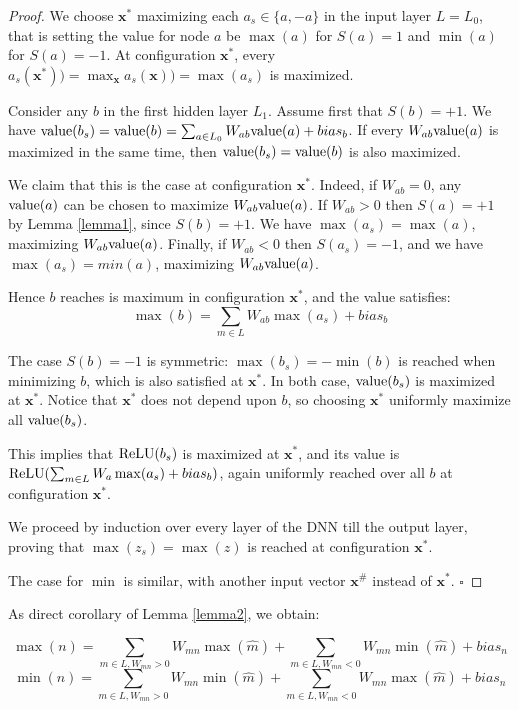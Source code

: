 		\begin{proof}
			We choose $\boldsymbol{x}^*$ maximizing each $a_s \in \{a,-a\}$ in the input layer $L=L_0$,
			that is setting the value for node $a$ be $\max(a)$ for $S(a)=1$ and $\min(a)$ for $S(a)=-1$.
			At configuration $\boldsymbol{x}^*$, every $a_s(\boldsymbol{x}^*))=\max_{\boldsymbol{x}} {a_s(\boldsymbol{x}))}=\max(a_s)$ is maximized.  
			
			Consider any $b$ in the first hidden layer $L_1$.
			Assume first that $S(b)=+1$.
			We have ${\textrm{value}}(b_s)= {\textrm{value}}(b) = \sum_{a \in L_0} W_{ab} {\textrm{value}}(a) + bias_b$.
			If every $W_{ab} {\textrm{value}}(a)$ is maximized in the same time, 
			then ${\textrm{value}}(b_s)= {\textrm{value}}(b)$ is also maximized. 
			
			We claim that this is the case at 
			configuration $\boldsymbol{x}^*$.
			Indeed, if $W_{ab}=0$, any ${\textrm{value}}(a)$ can be chosen to maximize 
			$W_{ab}{\textrm{value}}(a)$. If $W_{ab}>0$ then $S(a) = +1$ by Lemma \ref{lemma1}, since
			$S(b)=+1$. We have $\max(a_s) = \max(a)$, maximizing $W_{ab}{\textrm{value}}(a)$.
			Finally, if $W_{a b}<0$ then $S(a_s) = -1$, and we have 
			$\max(a_s) = min(a)$, maximizing $W_{ab}{\textrm{value}}(a)$.
			
			Hence $b$ reaches is maximum in configuration $\boldsymbol{x}^*$, and the value satisfies: 
			$$\max(b)=\sum_{m \in L}W_{a b} \max(a_s)+bias_b$$
			
			The case $S(b)=-1$ is symmetric:
			$\max(b_s)= -\min(b)$ is reached when minimizing $b$, which is also 
			satisfied at $\boldsymbol{x}^*$.
			In both case, ${\textrm{value}}(b_s)$ is maximized at $\boldsymbol{x}^*$. Notice that $\boldsymbol{x}^*$ does not depend upon $b$, so choosing $\boldsymbol{x}^*$ uniformly maximize all ${\textrm{value}}(b_s)$.
			
			This implies that $\mathrm{ReLU}(b_s)$ is maximized at $\boldsymbol{x}^*$, and its value is 
			$\mathrm{ReLU}(\sum_{m \in L}W_{a }\max(a_s)+bias_b)$, again uniformly reached over all $b$ at configuration $\boldsymbol{x}^*$.
			
			We proceed by induction over every layer of the DNN till the output layer, proving that 
			$\max(z_s)=\max(z)$ is reached at configuration $\boldsymbol{x}^*$.
			
			The case for $\min$ is similar, with another input vector $\boldsymbol{x}^\#$ instead of $\boldsymbol{x}^*$.
			\hfill $\square$
		\end{proof}
		
		As direct corollary of Lemma \ref{lemma2}, we obtain:
		
		\begin{corollary}
			\label{cor1}
			$$\max(n)=\sum_{m \in L, W_{m n}>0}W_{m n} \max(\hat{m}) + \sum_{m \in L, W_{m n}<0}W_{mn} \min(\hat{m}) + bias_n$$
			$$\min(n)=\sum_{m \in L, W_{m n}>0}W_{m n} \min(\hat{m}) + \sum_{m \in L, W_{m n}<0}W_{mn} \max(\hat{m}) + bias_n$$
		\end{corollary}
		
